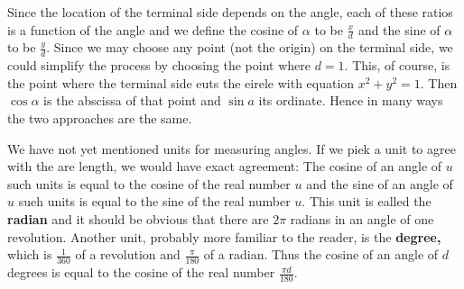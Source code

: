 
Since the location of the terminal side depends on the angle, each of these ratios is a function of
the angle and we define the cosine of $\alpha$ to be $\frac{x}{d}$ and the sine of $\alpha$ to be $\frac{y}{d}$. Since we may choose any point (not the origin) on the terminal side, we could simplify the process by choosing the point where
$d = 1$. This, of course, is the point where the terminal side euts the eirele with equation $x^2 +
y^2 = 1$. Then $\cos \alpha$ is the abscissa of that point and $\sin a$ its ordinate. Hence in many ways the two approaches are the same.

We have not yet mentioned units for measuring angles. If we piek a unit to agree with the are
length, we would have exact agreement: The cosine of an angle of $u$ such units is equal to the
cosine of the real number $u$ and the sine of an angle of $u$ sueh units is equal to the sine of the
real number $u$. This unit is ealled the \textbf{radian} and it should be obvious that there are $2\pi$ radians in an angle of one revolution. Another unit, probably more familiar to the reader, is the \textbf{degree,} which is $\frac{1}{360}$ of a revolution and $\frac{\pi}{180}$ of a radian. Thus the cosine of an angle of $d$ degrees is equal to the cosine of the real number $\frac{\pi d}{180}$.

 
